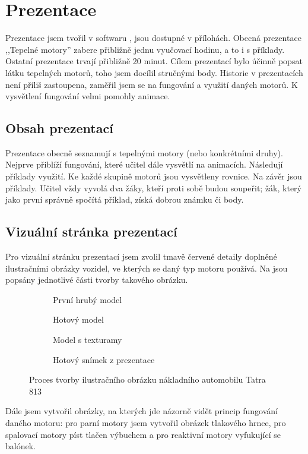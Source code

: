 \section{Prezentace}\label{sc:prezentace}
{Prezentace jsem tvořil v softwaru , jsou dostupné v přílohách. Obecná prezentace ,,Tepelné motory'' zabere přibližně jednu vyučovací hodinu, a to i s příklady. Ostatní prezentace trvají přibližně 20 minut.}\odst
{Cílem prezentací bylo účinně popsat látku tepelných motorů, toho jsem docílil stručnými body. Historie v prezentacích není příliš zastoupena, zaměřil jsem se na fungování a využití daných motorů. K vysvětlení fungování velmi pomohly animace.}
\subsection{Obsah prezentací}
{Prezentace obecně seznamují s tepelnými motory (nebo konkrétními druhy). Nejprve přiblíží fungování, které učitel dále vysvětlí na animacích. Následují příklady využití. Ke každé skupině motorů jsou vysvětleny rovnice.}\odst
{Na závěr jsou příklady. Učitel vždy vyvolá dva žáky, kteří proti sobě budou soupeřit; žák, který jako první správně spočítá příklad, získá dobrou známku či body.}
\newpage
\subsection{Vizuální stránka prezentací}
{Pro vizuální stránku prezentací jsem zvolil tmavě červené detaily doplněné ilustračními obrázky vozidel, ve kterých se daný typ motoru používá. Na  jsou popsány jednotlivé části tvorby takového obrázku.}

\begin{figure}[H]
    \begin{subfigure}{0.5\textwidth}
        \centering
        \caption{První hrubý model}
    \end{subfigure}
    \begin{subfigure}{0.5\linewidth}
        \centering
        \caption{Hotový model}
    \end{subfigure}
    \begin{subfigure}{0.5\linewidth}
        \centering
        \caption{Model s texturamy}
    \end{subfigure}
    \begin{subfigure}{0.5\linewidth}
        \centering
        \caption{Hotový snímek z prezentace}
    \end{subfigure}
    \caption{Proces tvorby ilustračního obrázku nákladního automobilu Tatra 813 \jaObr}
    \label{obr:tatra813}
\end{figure}

{Dále jsem vytvořil obrázky, na kterých jde názorně vidět princip fungování daného motoru: pro parní motory jsem vytvořil obrázek tlakového hrnce, pro spalovací motory píst tlačen výbuchem a pro reaktivní motory vyfukující se balónek.}